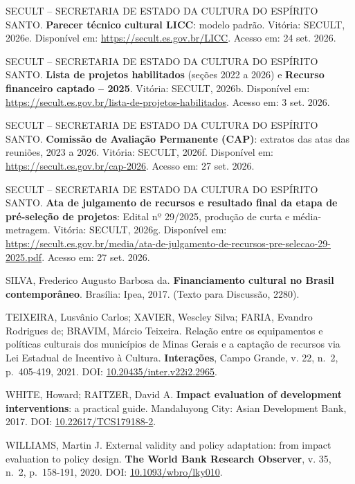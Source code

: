 \documentclass[12pt,a4paper]{article}
\newenvironment{referencias}{\raggedright\setlength{\parindent}{0pt}\setlength{\parskip}{0.5\baselineskip}}{\par}
\begin{document}
\begin{referencias}
\protect{}\label{ref-secult-41}{}SECULT -- SECRETARIA DE ESTADO DA CULTURA DO ESPÍRITO
SANTO. \textbf{Parecer técnico cultural LICC}: modelo padrão. Vitória: SECULT, 2026e. Disponível em:
\url{https://secult.es.gov.br/LICC}. Acesso em: 24 set. 2026.

\protect{}\label{ref-secult-42}{}SECULT -- SECRETARIA DE ESTADO DA CULTURA DO ESPÍRITO
SANTO. \textbf{Lista de projetos habilitados} (seções 2022 a 2026) e \textbf{Recurso financeiro
captado -- 2025}. Vitória: SECULT, 2026b. Disponível em:
\url{https://secult.es.gov.br/lista-de-projetos-habilitados}. Acesso em: 3 set. 2026.

\protect{}\label{ref-secult-43}{}SECULT -- SECRETARIA DE ESTADO DA CULTURA DO ESPÍRITO
SANTO. \textbf{Comissão de Avaliação Permanente (CAP)}: extratos das atas das reuniões, 2023 a 2026.
Vitória: SECULT, 2026f. Disponível em: \url{https://secult.es.gov.br/cap-2026}. Acesso em: 27 set.
2026.

\protect{}\label{ref-secult-44}{}SECULT -- SECRETARIA DE ESTADO DA CULTURA DO ESPÍRITO
SANTO. \textbf{Ata de julgamento de recursos e resultado final da etapa de pré-seleção de projetos}:
Edital nº 29/2025, produção de curta e média-metragem. Vitória: SECULT, 2026g. Disponível em:
\url{https://secult.es.gov.br/media/ata-de-julgamento-de-recursos-pre-selecao-29-2025.pdf}. Acesso
em: 27 set. 2026.

\protect{}\label{ref-silva-45}{}SILVA, Frederico Augusto Barbosa da.
\textbf{Financiamento cultural no Brasil contemporâneo}. Brasília: Ipea, 2017. (Texto para
Discussão, 2280).

\protect{}\label{ref-teixeira-46}{}TEIXEIRA, Lusvânio Carlos; XAVIER, Wescley Silva;
FARIA, Evandro Rodrigues de; BRAVIM, Márcio Teixeira. Relação entre os equipamentos e políticas
culturais dos municípios de Minas Gerais e a captação de recursos via Lei Estadual de Incentivo à
Cultura. \textbf{Interações}, Campo Grande, v. 22, n.~2, p.~405-419, 2021. DOI:
\href{https://doi.org/10.20435/inter.v22i2.2965}{10.20435/inter.v22i2.2965}.

\protect{}\label{ref-white-47}{}WHITE, Howard; RAITZER, David A. \textbf{Impact
evaluation of development interventions}: a practical guide. Mandaluyong City: Asian Development
Bank, 2017. DOI: \href{https://doi.org/10.22617/TCS179188-2}{10.22617/TCS179188-2}.

\protect{}\label{ref-williams-48}{}WILLIAMS, Martin J. External validity and policy
adaptation: from impact evaluation to policy design. \textbf{The World Bank Research Observer}, v.
35, n.~2, p.~158-191, 2020. DOI: \href{https://doi.org/10.1093/wbro/lky010}{10.1093/wbro/lky010}.
\end{referencias}
\end{document}
